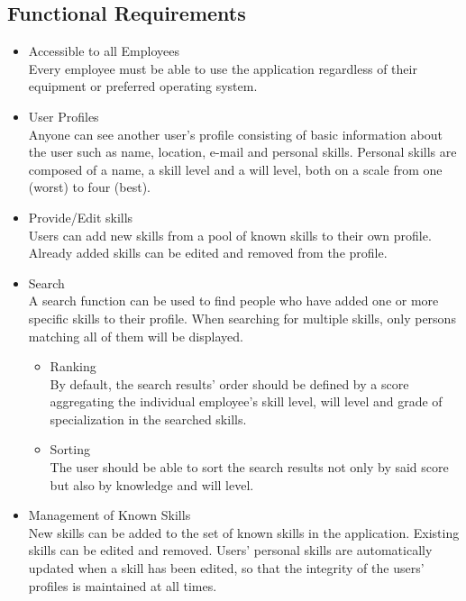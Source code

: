 \subsection{Functional Requirements}
\begin{itemize}
 	\item Accessible to all Employees\\
	Every employee must be able to use the application regardless of their equipment or preferred operating system.
	\item User Profiles \\
	Anyone can see another user’s profile consisting of basic information about the user such as name, location, e-mail and personal skills. Personal skills are composed of a name, a skill level and a will level, both on a scale from one (worst) to four (best).
	\item Provide/Edit skills\\
	Users can add new skills from a pool of known skills to their own profile. Already added skills can be edited and removed from the profile.
	\item Search\\
	A search function can be used to find people who have added one or more specific skills to their profile. When searching for multiple skills, only persons matching all of them will be displayed.
	\begin{itemize}
		\item Ranking\\
			By default, the search results' order should be defined by a score aggregating the individual employee's skill level, will level and grade of specialization in the searched skills.
		\item Sorting\\
			The user should be able to sort the search results not only by said score
			but also by knowledge and will level.
	\end{itemize}
	\item Management of Known Skills\\
	New skills can be added to the set of known skills in the application. Existing skills can be edited and removed. Users' personal skills are automatically updated when a skill has been edited, so that the integrity of the users' profiles is maintained at all times.
\end{itemize}

